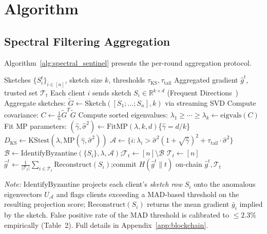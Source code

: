 \section{Algorithm}
\label{sec:algorithm}

\subsection{Spectral Filtering Aggregation}

Algorithm~\ref{alg:spectral_sentinel} presents the per-round aggregation protocol.

\begin{algorithm}[htbp]
\caption{Spectral Filtering Aggregation (one round $t$)}
\label{alg:spectral_sentinel}
\begin{algorithmic}[1]
\Require Sketches $\{S_i^t\}_{i \in [n]}$, sketch size $k$, thresholds $\tau_{\text{KS}}, \tau_{\text{tail}}$
\Ensure Aggregated gradient $\hat{g}^t$, trusted set $\mathcal{T}_t$
\State Each client $i$ sends sketch $S_i \in \mathbb{R}^{k \times d}$ (Frequent Directions~\cite{frequent_directions,ghashami_fd})
\State Aggregate sketches: $\tilde{G} \gets \mathrm{Sketch}([S_1;\ldots;S_n], k)$ via streaming SVD
\State Compute covariance: $C \gets \frac{1}{n}\tilde{G}^T\tilde{G}$
\State Compute sorted eigenvalues: $\lambda_1 \geq \cdots \geq \lambda_k \gets \mathrm{eigvals}(C)$
\State Fit MP parameters: $(\hat{\gamma}, \hat{\sigma}^2) \gets \mathrm{FitMP}(\lambda, k, d)$\quad \{$\hat{\gamma} = d/k$\}
\State $D_{\text{KS}} \gets \mathrm{KStest}(\lambda, \mathrm{MP}(\hat{\gamma}, \hat{\sigma}^2))$
\State $\mathcal{A} \gets \{i : \lambda_i > \hat{\sigma}^2(1+\sqrt{\hat{\gamma}})^2 + \tau_{\text{tail}}\cdot\hat{\sigma}^2\}$
  \State $\mathcal{B} \gets \mathrm{IdentifyByzantine}(\{S_i\}, \lambda, \mathcal{A})$;\quad $\mathcal{T}_t \gets [n]\setminus\mathcal{B}$
\Else
  \State $\mathcal{T}_t \gets [n]$
\EndIf
\State $\hat{g}^t \gets \frac{1}{|\mathcal{T}_t|}\sum_{i \in \mathcal{T}_t} \mathrm{Reconstruct}(S_i)$;\quad commit $H(\hat{g}^t \| t)$ on-chain
\State \Return $\hat{g}^t, \mathcal{T}_t$
\end{algorithmic}
\end{algorithm}

\noindent\textit{Note:} $\mathrm{IdentifyByzantine}$ projects each client's \emph{sketch row} $S_i$ onto the anomalous eigenvectors $U_{\mathcal{A}}$ and flags clients exceeding a MAD-based threshold on the resulting projection score; $\mathrm{Reconstruct}(S_i)$ returns the mean gradient $\bar{g}_i$ implied by the sketch. False positive rate of the MAD threshold is calibrated to $\leq 2.3\%$ empirically (Table~2). Full details in Appendix~\ref{app:blockchain}.

